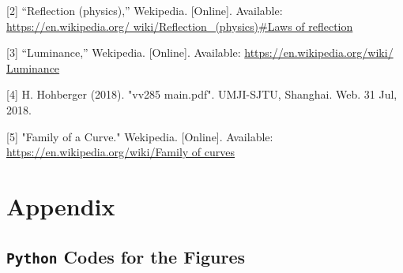 \documentclass[a4paper]{article}
\begin{document}
[2] “Reflection (physics),” Wekipedia. [Online]. Available: \url{https://en.wikipedia.org/ wiki/Reﬂection_(physics)#Laws of reflection}

[3] “Luminance,” Wekipedia. [Online]. Available: \url{https://en.wikipedia.org/wiki/ Luminance}

[4] H. Hohberger (2018). "vv285 main.pdf". UMJI-SJTU, Shanghai. Web. 31 Jul, 2018.

[5] "Family of a Curve." Wekipedia. [Online]. Available: \url{https://en.wikipedia.org/wiki/Family of curves}
\section{Appendix}
\subsection{\texttt{Python} Codes for the Figures}
%
\end{document}
